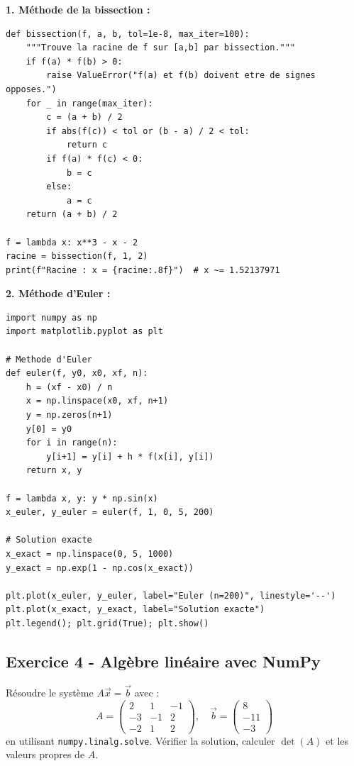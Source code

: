 \documentclass[12pt,a4paper]{article}
\begin{document}
\begin{boitecorrige}
\textbf{1. Méthode de la bissection :}
\begin{lstlisting}
def bissection(f, a, b, tol=1e-8, max_iter=100):
    """Trouve la racine de f sur [a,b] par bissection."""
    if f(a) * f(b) > 0:
        raise ValueError("f(a) et f(b) doivent etre de signes opposes.")
    for _ in range(max_iter):
        c = (a + b) / 2
        if abs(f(c)) < tol or (b - a) / 2 < tol:
            return c
        if f(a) * f(c) < 0:
            b = c
        else:
            a = c
    return (a + b) / 2

f = lambda x: x**3 - x - 2
racine = bissection(f, 1, 2)
print(f"Racine : x = {racine:.8f}")  # x ~= 1.52137971
\end{lstlisting}

\textbf{2. Méthode d'Euler :}
\begin{lstlisting}
import numpy as np
import matplotlib.pyplot as plt

# Methode d'Euler
def euler(f, y0, x0, xf, n):
    h = (xf - x0) / n
    x = np.linspace(x0, xf, n+1)
    y = np.zeros(n+1)
    y[0] = y0
    for i in range(n):
        y[i+1] = y[i] + h * f(x[i], y[i])
    return x, y

f = lambda x, y: y * np.sin(x)
x_euler, y_euler = euler(f, 1, 0, 5, 200)

# Solution exacte
x_exact = np.linspace(0, 5, 1000)
y_exact = np.exp(1 - np.cos(x_exact))

plt.plot(x_euler, y_euler, label="Euler (n=200)", linestyle='--')
plt.plot(x_exact, y_exact, label="Solution exacte")
plt.legend(); plt.grid(True); plt.show()
\end{lstlisting}
\end{boitecorrige}

\subsection*{Exercice 4 - Algèbre linéaire avec NumPy \niveau{\moyen}}

\begin{boiteexercice}
Résoudre le système $A\vec{x}=\vec{b}$ avec :
\[
A = \begin{pmatrix}2&1&-1\\-3&-1&2\\-2&1&2\end{pmatrix}, \quad \vec{b} = \begin{pmatrix}8\\-11\\-3\end{pmatrix}
\]
en utilisant \texttt{numpy.linalg.solve}. Vérifier la solution, calculer $\det(A)$ et les valeurs propres de $A$.
\end{boiteexercice}
\end{document}
